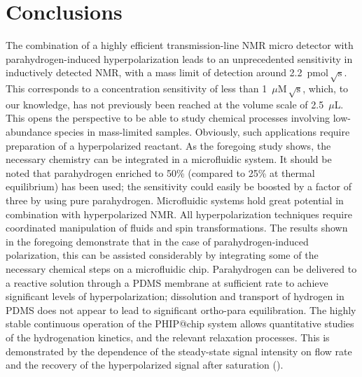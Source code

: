 \section{Conclusions}

The combination of a highly efficient transmission-line NMR micro detector with
parahydrogen-induced hyper\-polarization leads to an un\-precedented sensitivity
in inductively detected NMR, with a mass limit of detection around
2.2~$\text{pmol}\,\sqrt{\mathrm{s}}$. This corresponds to a concentration
sensitivity of less than 1~$\mu \mathrm{M}\,\sqrt{\text{s}}$,
which, to our knowledge, has not previously been reached at the volume
scale of 2.5~$\mu$L.
This opens the perspective to be able to study chemical processes involving
low-abundance species in mass-limited samples. Obviously, such applications
require preparation of a hyperpolarized reactant. As the foregoing study shows,
the necessary chemistry can be integrated in a microfluidic system.
It should be noted that
parahydrogen enriched to 50\% (compared to 25\%
at thermal equilibrium) has been used; the sensitivity
could easily be boosted by a factor of three by using pure parahydrogen.
Microfluidic systems hold great potential in combination
with hyperpolarized NMR. All hyperpolarization techniques require coordinated
manipulation of fluids and spin transformations. The results shown in the
foregoing demonstrate that in the case of parahydrogen-induced polarization,
this can be assisted considerably by integrating some of the necessary chemical
steps on a microfluidic chip. Parahydrogen can be delivered to a reactive
solution through a PDMS membrane at sufficient rate to achieve significant
levels of hyperpolarization; dissolution and transport of hydrogen in PDMS does
not appear to lead to significant ortho-para equilibration.
The highly stable continuous operation
of the PHIP@chip system allows quantitative studies
of the hydrogenation kinetics, and the relevant relaxation processes.
This is demonstrated by the dependence of the steady-state signal intensity on
flow rate and the recovery of the
hyperpolarized signal after saturation ().

